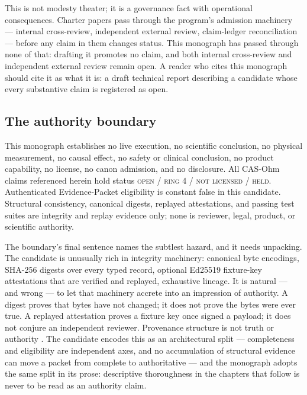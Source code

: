 This is not modesty theater; it is a governance fact with operational consequences. Charter papers pass through the program's admission machinery --- internal cross-review, independent external review, claim-ledger reconciliation --- before any claim in them changes status. This monograph has passed through none of that: drafting it promotes no claim, and both internal cross-review and independent external review remain open. A reader who cites this monograph should cite it as what it is: a draft technical report describing a candidate whose every substantive claim is registered as open.

\subsection{The authority boundary}\label{ch01:charter:authority}

\begin{boundary}\label{ch01:bd:authority}
This monograph establishes no live execution, no scientific conclusion, no physical measurement, no causal effect, no safety or clinical conclusion, no product capability, no license, no canon admission, and no disclosure. All CAS-Ohm claims referenced herein hold status \textsc{open / ring 4 / not licensed / held}. Authenticated Evidence-Packet eligibility is constant false in this candidate. Structural consistency, canonical digests, replayed attestations, and passing test suites are integrity and replay evidence only; none is reviewer, legal, product, or scientific authority.
\end{boundary}

The boundary's final sentence names the subtlest hazard, and it needs unpacking. The candidate is unusually rich in integrity machinery: canonical byte encodings, SHA-256 digests over every typed record, optional Ed25519 fixture-key attestations that are verified and replayed, exhaustive lineage. It is natural --- and wrong --- to let that machinery accrete into an impression of authority. A digest proves that bytes have not changed; it does not prove the bytes were ever true. A replayed attestation proves a fixture key once signed a payload; it does not conjure an independent reviewer. Provenance structure is not truth or authority \cite{prov}. The candidate encodes this as an architectural split --- completeness and eligibility are independent axes, and no accumulation of structural evidence can move a packet from complete to authoritative --- and the monograph adopts the same split in its prose: descriptive thoroughness in the chapters that follow is never to be read as an authority claim.


